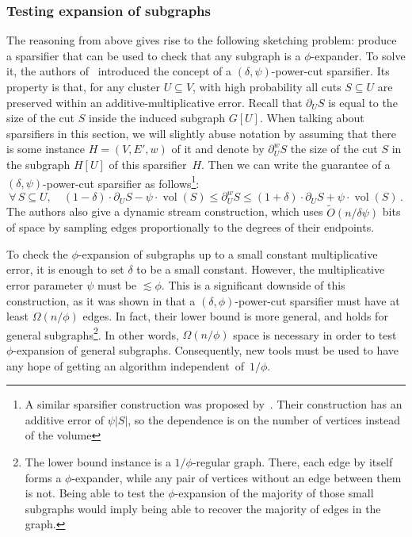 \documentclass[epsfig,letter,11pt]{article}
\numberwithin{equation}{section}
\DeclareMathOperator{\vol}{vol}
\newcommand{\otil}{\tilde{O}}
\newcommand{\uncut}[2]{{\partial}_{#2} #1}
\newcommand{\wcut}[2]{\partial^w_{#2} #1}
\renewcommand{\tilde}{\widetilde}
\begin{document}
\subsubsection*{Testing expansion of subgraphs}
The reasoning from above gives rise to the following sketching problem: produce a sparsifier that can be used to check that any subgraph is a $\phi$-expander. To solve it, the authors of~\cite{streamexpdec} introduced the concept of a $(\delta,\psi)$-power-cut sparsifier. Its property is that, for any cluster $U \subseteq V$, with high probability all cuts $S \subseteq U$ are preserved within an additive-multiplicative error.
Recall that $\uncut{S}{U}$ is equal to the size of the cut $S$ inside the induced subgraph $G[U]$.
When talking about sparsifiers in this section, we will slightly abuse notation by assuming that there is some instance $H=(V,E',w)$ of it and denote by $\wcut{S}{U}$ the size of the cut $S$ in the subgraph $H[U]$ of this sparsifier~$H$. Then we can write the guarantee of a $(\delta, \psi)$-power-cut sparsifier as follows\footnote{A similar sparsifier construction was proposed by~\cite{sublinhierarchical}. Their construction has an additive error of $\psi |S|$, so the dependence is on the number of vertices instead of the volume}:
\begin{equation*}
	\forall \, S \subseteq U, \quad  (1-\delta)\cdot \uncut{S}{U}-\psi \cdot \vol(S) \le \wcut{S}{U} \le (1+\delta)\cdot \uncut{S}{U}+\psi \cdot \vol(S) \, .
\end{equation*}
The authors also give a dynamic stream construction, which uses $\otil(n/\delta\psi)$ bits of space by sampling edges proportionally to the degrees of their endpoints.


To check the $\phi$-expansion of subgraphs up to a small constant multiplicative error, it is enough to set $\delta$ to be a small constant. However, the multiplicative error parameter $\psi$ must be $\lesssim \phi$. 
This is a significant downside of this construction, as it was shown in \cite{streamexpdec} that a $(\delta, \phi)$-power-cut sparsifier must have at least $\Omega(n /\phi)$ edges. In fact, their lower bound is more general, and holds for general subgraphs\footnote{The lower bound instance is a $1/\phi$-regular graph. There, each edge by itself forms a $\phi$-expander, while any pair of vertices without an edge between them is not. Being able to test the $\phi$-expansion of the majority of those small subgraphs would imply being able to recover the majority of edges in the graph.}.
In other words, {$\Omega(n/\phi)$} space is necessary in order to test {$\phi$}-expansion of general subgraphs. Consequently, new tools must be used to have any hope of getting an algorithm independent~of~$1 / \phi$.
\end{document}
